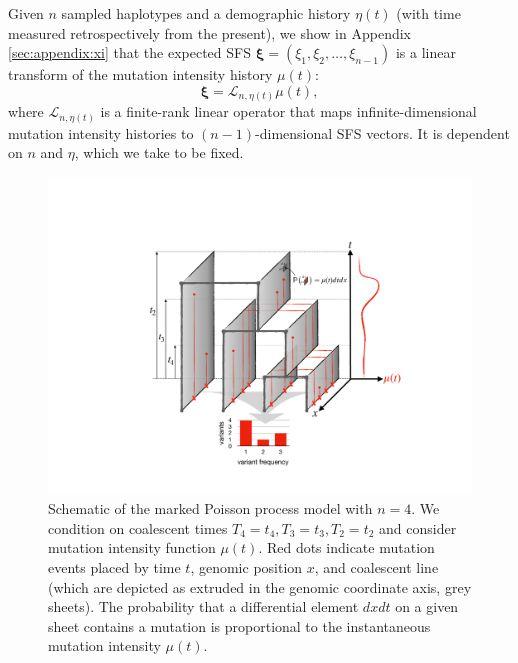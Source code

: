 \documentclass[11pt]{article}
\begin{document}
Given $n$ sampled haplotypes and a demographic history $\eta(t)$ (with time measured retrospectively from the present), we show in Appendix \ref{sec:appendix:xi} that the expected SFS $\boldsymbol \xi = (\xi_1, \xi_2,\dots, \xi_{n-1})$ is a linear transform of the mutation intensity history $\mu(t)$:
\begin{equation}
  \label{eqn:transform}
\boldsymbol \xi = \mathcal{L}_{n,\eta(t)}\mu(t),
\end{equation}
where $\mathcal{L}_{n,\eta(t)}$ is a finite-rank linear operator that maps infinite-dimensional mutation intensity histories to $(n-1)$-dimensional SFS vectors.
It is dependent on $n$ and $\eta$, which we take to be fixed.


\begin{figure}
\centering
\includegraphics[width=\textwidth]{figures/model}
\caption{Schematic of the marked Poisson process model with $n=4$.
We condition on coalescent times $T_4=t_4,T_3=t_3,T_2=t_2$ and consider mutation intensity function $\mu(t)$.
Red dots indicate mutation events placed by time $t$, genomic position $x$, and coalescent line (which are depicted as extruded in the genomic coordinate axis, grey sheets).
The probability that a differential element $dxdt$ on a given sheet contains a mutation is proportional to the instantaneous mutation intensity $\mu(t)$.
}
\label{fig:model}
\end{figure}
\end{document}
